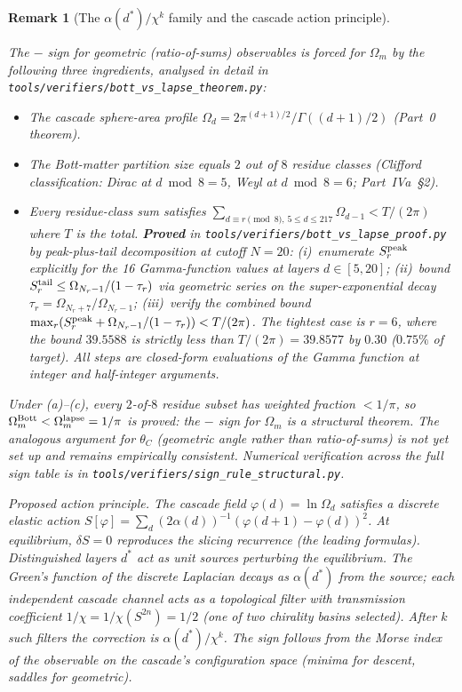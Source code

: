 \documentclass[12pt,a4paper]{article}
\newtheorem*{remark}{Remark}
\begin{document}
\begin{remark}[The $\alpha(d^*)/\chi^k$ family and the cascade action principle]
\begin{enumerate}
The $-$ sign for geometric (ratio-of-sums) observables is \emph{forced for $\Omega_m$} by the following three ingredients, analysed in detail in \texttt{tools/\allowbreak verifiers/\allowbreak bott\_vs\_\allowbreak lapse\_\allowbreak theorem.py}:
\begin{itemize}[nosep]
\item[(a)] The cascade sphere-area profile $\Omega_d = 2\pi^{(d+1)/2}/\Gamma((d+1)/2)$ (Part~0 theorem).
\item[(b)] The Bott-matter partition size equals $2$ out of $8$ residue classes (Clifford classification: Dirac at $d\bmod 8 = 5$, Weyl at $d\bmod 8 = 6$; Part~IVa~\S2).
\item[(c)] Every residue-class sum satisfies $\sum_{d\equiv r \pmod 8,\,5\le d\le 217}\Omega_{d-1} < T/(2\pi)$ where $T$ is the total. \textbf{Proved} in \texttt{tools/verifiers/bott\_vs\_lapse\_proof.py} by peak-plus-tail decomposition at cutoff $N = 20$: (i)~enumerate $S_r^{\rm peak}$ explicitly for the 16 Gamma-function values at layers $d\in[5,20]$; (ii)~bound $S_r^{\rm tail} \leq \Omega_{N_r-1}/(1 - \tau_r)$ via geometric series on the super-exponential decay $\tau_r = \Omega_{N_r+7}/\Omega_{N_r-1}$; (iii)~verify the combined bound $\max_r(S_r^{\rm peak} + \Omega_{N_r-1}/(1-\tau_r)) < T/(2\pi)$. The tightest case is $r = 6$, where the bound $39.5588$ is strictly less than $T/(2\pi) = 39.8577$ by $0.30$ ($0.75\%$ of target). All steps are closed-form evaluations of the Gamma function at integer and half-integer arguments.
\end{itemize}
Under (a)--(c), every $2$-of-$8$ residue subset has weighted fraction $< 1/\pi$, so $\Omega_m^{\rm Bott} < \Omega_m^{\rm lapse} = 1/\pi$ is \emph{proved}: the $-$ sign for $\Omega_m$ is a structural theorem. The analogous argument for $\theta_C$ (geometric angle rather than ratio-of-sums) is not yet set up and remains empirically consistent. Numerical verification across the full sign table is in \texttt{tools/verifiers/sign\_rule\_structural.py}.
\end{enumerate}

\emph{Proposed action principle.} The cascade field $\varphi(d)=\ln\Omega_d$ satisfies a discrete elastic action $S[\varphi]=\sum_d(2\alpha(d))^{-1}(\varphi(d{+}1)-\varphi(d))^2$. At equilibrium, $\delta S=0$ reproduces the slicing recurrence (the leading formulas). Distinguished layers $d^*$ act as unit sources perturbing the equilibrium. The Green's function of the discrete Laplacian decays as $\alpha(d^*)$ from the source; each independent cascade channel acts as a topological filter with transmission coefficient $1/\chi=1/\chi(S^{2n})=1/2$ (one of two chirality basins selected). After $k$ such filters the correction is $\alpha(d^*)/\chi^k$. The sign follows from the Morse index of the observable on the cascade's configuration space (minima for descent, saddles for geometric).


\end{remark}
\end{document}
